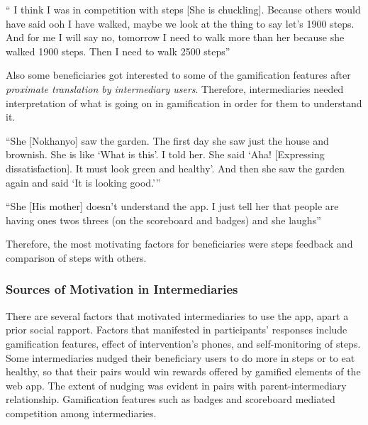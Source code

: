 {`` I think I was in competition with steps [She is chuckling]. Because others would have said ooh I have walked, maybe we look at the thing to say let’s 1900 steps. And for me I will say no, tomorrow I need to walk more than her because she walked 1900 steps. Then I need to walk 2500 steps''} 

Also some beneficiaries got interested to some of the gamification features after \emph{proximate translation by intermediary users}. Therefore, intermediaries needed interpretation of what is going on in gamification in order for them to understand it.

 {``She [Nokhanyo] saw the garden. The first day she saw just the house and brownish. She
is like `What is this'. I told her. She said `Aha! [Expressing
dissatisfaction]. It must look green and healthy'. And then
she saw the garden again and said `It is looking good.'''}  

 {``She [His mother] doesn't understand the app. I just tell her that people are having ones twos threes (on the scoreboard and badges) and she laughs''} 

Therefore, the most motivating factors for beneficiaries were steps feedback and comparison of steps with others. 
\subsubsection{Sources of Motivation in Intermediaries}
There are several factors that motivated intermediaries to use the app, apart a prior social rapport. Factors that manifested in participants' responses include gamification features, effect of intervention's phones, and self-monitoring of steps. Some intermediaries nudged their beneficiary
users to do more in steps or to eat healthy, so that their pairs would win rewards offered by gamified elements of the web app. The extent of nudging was evident in pairs with parent-intermediary relationship. Gamification features such as badges and scoreboard mediated competition among intermediaries.


